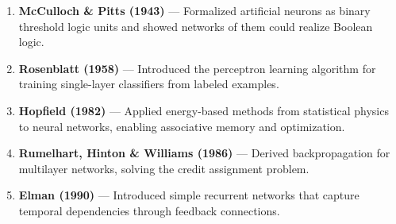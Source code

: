 \begin{enumerate}
\item \textbf{McCulloch \& Pitts (1943)} --- Formalized artificial neurons as binary threshold logic units and showed networks of them could realize Boolean logic.

\item \textbf{Rosenblatt (1958)} --- Introduced the perceptron learning algorithm for training single-layer classifiers from labeled examples.

\item \textbf{Hopfield (1982)} --- Applied energy-based methods from statistical physics to neural networks, enabling associative memory and optimization.

\item \textbf{Rumelhart, Hinton \& Williams (1986)} --- Derived backpropagation for multilayer networks, solving the credit assignment problem.

\item \textbf{Elman (1990)} --- Introduced simple recurrent networks that capture temporal dependencies through feedback connections.
\end{enumerate}
